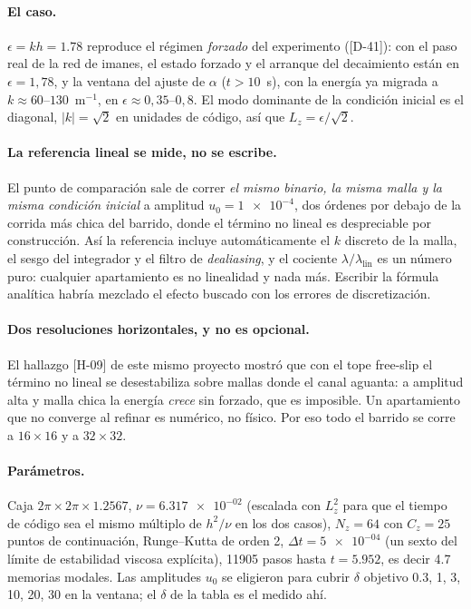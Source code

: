 \documentclass[11pt,a4paper]{article}
\begin{document}
\paragraph{El caso.} $\epsilon = kh = 1.78$ reproduce el régimen \emph{forzado} del
experimento ([D-41]): con el paso real de la red de imanes, el estado forzado y el arranque
del decaimiento están en $\epsilon = 1{,}78$, y la ventana del ajuste de $\alpha$
($t > 10$~s), con la energía ya migrada a $k \approx 60$--$130$~m$^{-1}$, en
$\epsilon \approx 0{,}35$--$0{,}8$. El modo dominante de la condición inicial es el diagonal,
$|k| = \sqrt2$ en unidades de código, así que $L_z = \epsilon/\sqrt2$.

\paragraph{La referencia lineal se mide, no se escribe.} El punto de comparación sale de
correr \emph{el mismo binario, la misma malla y la misma condición inicial} a amplitud
$u_0 = \num{1e-4}$, dos órdenes por debajo de la corrida más chica del barrido, donde
el término no lineal es despreciable por construcción. Así la referencia incluye
automáticamente el $k$ discreto de la malla, el sesgo del integrador y el filtro de
\emph{dealiasing}, y el cociente $\lambda/\lambda_\text{lin}$ es un número puro:
cualquier apartamiento es no linealidad y nada más. Escribir la fórmula analítica habría
mezclado el efecto buscado con los errores de discretización.

\paragraph{Dos resoluciones horizontales, y no es opcional.} El hallazgo [H-09] de este
mismo proyecto mostró que con el tope free-slip el término no lineal se desestabiliza sobre
mallas donde el canal aguanta: a amplitud alta y malla chica la energía \emph{crece} sin
forzado, que es imposible. Un apartamiento que no converge al refinar es numérico, no
físico. Por eso todo el barrido se corre a $16\times16$ y a $32\times32$.

\paragraph{Parámetros.} Caja $2\pi\times2\pi\times1.2567$, $\nu = \num{6.317e-02}$
(escalada con $L_z^2$ para que el tiempo de código sea el mismo múltiplo de $h^2/\nu$ en
los dos casos), $N_z = 64$ con $C_z = 25$ puntos de continuación, Runge--Kutta de
orden 2, $\Delta t = \num{5e-04}$ (un sexto del límite de estabilidad viscosa
explícita), 11905 pasos hasta $t = 5.952$, es decir 4.7 memorias
modales. Las amplitudes $u_0$ se eligieron para cubrir $\delta$ objetivo
0.3, 1, 3, 10, 20, 30 en la ventana; el $\delta$ de la tabla es el medido ahí.
\end{document}
